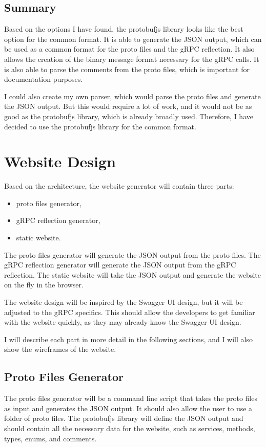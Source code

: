 \subsection{Summary}

Based on the options I have found, the protobufjs library looks like the best option for the common format.
It is able to generate the JSON output, which can be used as a common format for the proto files and the gRPC reflection.
It also allows the creation of the binary message format necessary for the gRPC calls.
It is also able to parse the comments from the proto files, which is important for documentation purposes.

I could also create my own parser, which would parse the proto files and generate the JSON output.
But this would require a lot of work, and it would not be as good as the protobufjs library, which is already broadly used.
Therefore, I have decided to use the protobufjs library for the common format.


\section{Website Design}
Based on the architecture, the website generator will contain three parts:
\begin{itemize}
    \item proto files generator,
    \item gRPC reflection generator,
    \item static website.
\end{itemize}

The proto files generator will generate the JSON output from the proto files.
The gRPC reflection generator will generate the JSON output from the gRPC reflection.
The static website will take the JSON output and generate the website on the fly in the browser.

The website design will be inspired by the Swagger UI design, but it will be adjusted to the gRPC specifics.
This should allow the developers to get familiar with the website quickly, as they may already know the Swagger UI design.

I will describe each part in more detail in the following sections, and I will also show the wireframes of the website.

\subsection{Proto Files Generator}
The proto files generator will be a command line script that takes the proto files as input and generates the JSON output.
It should also allow the user to use a folder of proto files.
The protobufjs library will define the JSON output and should contain all the necessary data for the website, such as services, methods, types, enums, and comments.

